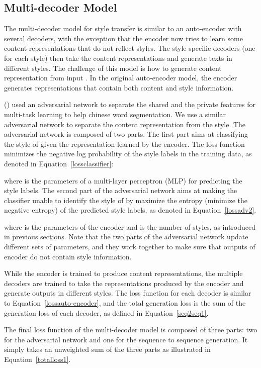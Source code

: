 \documentclass[letterpaper]{article} \usepackage{aaai18}  \usepackage{times}  \usepackage{helvet}  \usepackage{courier}  \usepackage{url}  \usepackage{graphicx}  \usepackage{amsmath}
\newcommand{\newcite}[1]{\citeauthor{#1} (\citeyear{#1})}
\begin{document}
\subsection{Multi-decoder Model}
The multi-decoder model for style transfer is similar to an auto-encoder with several decoders, with the 
exception that the encoder now tries to learn some content representations that do not reflect styles. 
The style specific decoders (one for each style) then take the content representations and generate 
texts in different styles. The challenge of this model is how to generate content representation  from input . 
In the original auto-encoder model, the encoder generates representations that contain both content and style information.

\newcite{chen2017adversarial} used an adversarial network to separate the shared and the private features for multi-task learning to help chinese word segmentation. 
We use a similar adversarial network to separate the content representation  from the style.
The adversarial network is composed of two parts.
The first part aims at classifying the style of  given the representation learned by the encoder.
The loss function minimizes the negative log probability of the style labels in the training data, as denoted in Equation~\ref{lossclassifier}: 
{\small

} where  is the parameters of a multi-layer perceptron (MLP) for predicting the style labels. 
The second part of the adversarial network aims at making the classifier unable to identify the style of  by 
maximize the entropy (minimize the negative entropy) of the predicted style labels, as denoted in Equation~\ref{lossadv2}. 
{\small

} where  is the parameters of the encoder and  is the number of styles, as introduced in previous sections. 
Note that the two parts of the adversarial network update different sets of parameters, and
they work together to make sure that outputs of encoder  do not contain style information. 

While the encoder is trained to produce content representations, the multiple decoders are trained to 
take the representations produced by the encoder and generate outputs in different styles. 
The loss function for each decoder is similar to  Equation~\ref{lossauto-encoder}, and the total generation 
loss is the sum of the generation loss of each decoder, as defined in Equation~\ref{seq2seq1}.
{\small

}The final loss function of the multi-decoder model is composed of three parts: 
two for the adversarial network and one for the sequence to sequence generation.   
It simply takes an unweighted sum of the three parts as illustrated in Equation~\ref{totalloss1}.
{\small

}
\end{document}
